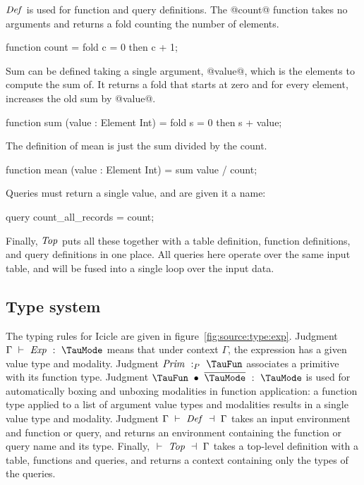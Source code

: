 $\mathit{Def}$ is used for function and query definitions.
The @count@ function takes no arguments and returns a fold counting the number of elements.
\begin{code}
function count
 = fold c = 0 then c + 1;
\end{code}

Sum can be defined taking a single argument, @value@, which is the elements to compute the sum of.
It returns a fold that starts at zero and for every element, increases the old sum by @value@.
\begin{code}
function sum (value : Element Int)
 = fold s = 0 then s + value;
\end{code}

The definition of mean is just the sum divided by the count.
\begin{code}
function mean (value : Element Int)
 = sum value / count;
\end{code}

Queries must return a single value, and are given it a name:
\begin{code}
query count_all_records = count;
\end{code}

Finally, $\mathit{Top}$ puts all these together with a table definition, function definitions, and query definitions in one place.
All queries here operate over the same input table, and will be fused into a single loop over the input data.




\subsection{Type system}

The typing rules for Icicle are given in figure~\ref{fig:source:type:exp}.
Judgment $\Typecheck{\Gamma}{\mi{Exp}}{\TauMode}$ means that under context $\Gamma$, the expression has a given value type and modality.
Judgment $\TypecheckP{\mi{Prim}}{\TauFun}$ associates a primitive with its function type.
Judgment $\TypecheckApp{\TauFun}{\ov{\TauMode}}{\TauMode}$ is used for automatically boxing and unboxing modalities in function application: a function type applied to a list of argument value types and modalities results in a single value type and modality.
Judgment $\TypecheckS{\Gamma}{\mi{Def}}{\Gamma}$ takes an input environment and function or query, and returns an environment containing the function or query name and its type.
Finally, $\TypecheckS{}{\mi{Top}}{\Gamma}$ takes a top-level definition with a table, functions and queries, and returns a context containing only the types of the queries.

